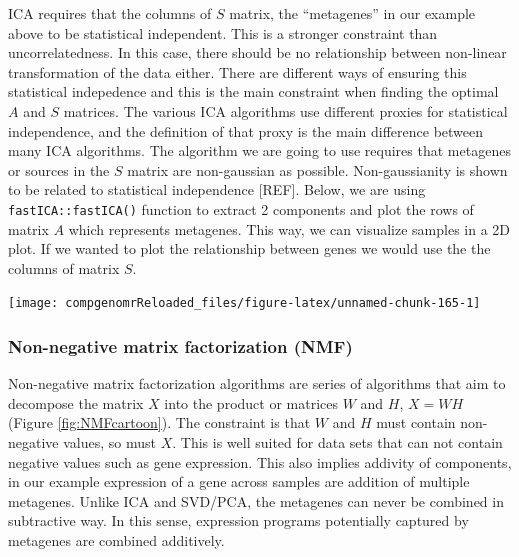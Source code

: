 \documentclass[12pt,]{krantz}
\newenvironment{Shaded}{\begin{snugshade}}{\end{snugshade}}
\newcommand{\CommentTok}[1]{\textcolor[rgb]{0.56,0.35,0.01}{\textit{#1}}}
\newcommand{\DataTypeTok}[1]{\textcolor[rgb]{0.13,0.29,0.53}{#1}}
\newcommand{\DecValTok}[1]{\textcolor[rgb]{0.00,0.00,0.81}{#1}}
\newcommand{\KeywordTok}[1]{\textcolor[rgb]{0.13,0.29,0.53}{\textbf{#1}}}
\newcommand{\NormalTok}[1]{#1}
\newcommand{\OperatorTok}[1]{\textcolor[rgb]{0.81,0.36,0.00}{\textbf{#1}}}
\begin{document}
ICA requires that the columns of \(S\) matrix, the ``metagenes'' in our example above to be statistical independent. This is a stronger constraint than uncorrelatedness. In this case, there should be no relationship between non-linear transformation of the data either. There are different ways of ensuring this statistical indepedence and this is the main constraint when finding the optimal \(A\) and \(S\) matrices. The various ICA algorithms use different proxies for statistical independence, and the definition of that proxy is the main difference between many ICA algorithms. The algorithm we are going to use requires that metagenes or sources in the \(S\) matrix are non-gaussian as possible. Non-gaussianity is shown to be related to statistical independence {[}REF{]}. Below, we are using \texttt{fastICA::fastICA()} function to extract 2 components and plot the rows of matrix \(A\) which represents metagenes. This way, we can visualize samples in a 2D plot. If we wanted to plot the relationship between genes we would use the the columns of matrix \(S\).

\begin{Shaded}
\end{Shaded}

\begin{center}\texttt{[image: compgenomrReloaded\_files/figure-latex/unnamed-chunk-165-1]} \end{center}

\hypertarget{non-negative-matrix-factorization-nmf}{%
\subsubsection{Non-negative matrix factorization (NMF)}\label{non-negative-matrix-factorization-nmf}}

Non-negative matrix factorization algorithms are series of algorithms that aim to decompose the matrix \(X\) into the product or matrices \(W\) and \(H\), \(X=WH\) (Figure \ref{fig:NMFcartoon}). The constraint is that \(W\) and \(H\) must contain non-negative values, so must \(X\). This is well suited for data sets that can not contain negative values such as gene expression. This also implies addivity of components, in our example expression of a gene across samples are addition of multiple metagenes. Unlike ICA and SVD/PCA, the metagenes can never be combined in subtractive way. In this sense, expression programs potentially captured by metagenes are combined additively.
\end{document}
